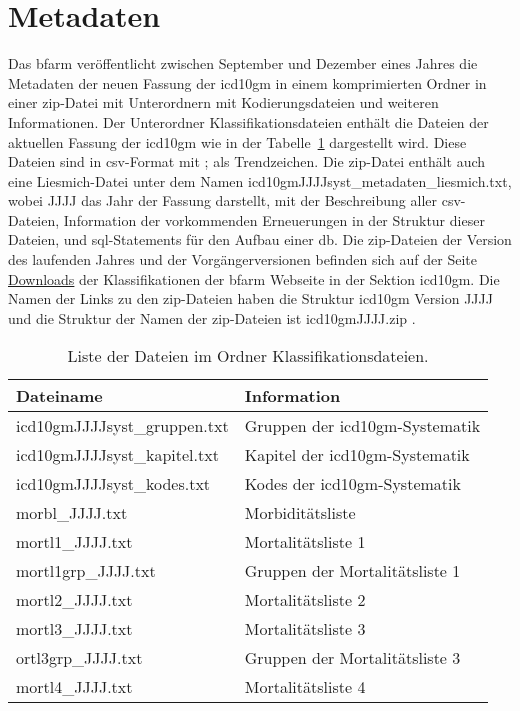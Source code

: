 \section{Metadaten} \label{sec:metadata}

Das \ac{bfarm} veröffentlicht zwischen September und Dezember eines Jahres die Metadaten der neuen Fassung der \ac{icd10gm} in einem komprimierten Ordner in einer \ac{zip}-Datei mit Unterordnern  mit Kodierungsdateien und weiteren Informationen. Der Unterordner Klassifikationsdateien enthält die Dateien der aktuellen Fassung der \ac{icd10gm} wie in der Tabelle~\ref{tab:classfiles} dargestellt wird. Diese Dateien sind in \ac{csv}-Format mit \glqq ;\grqq{} als Trendzeichen. Die \ac{zip}-Datei enthält auch eine Liesmich-Datei unter dem Namen \glqq\textsf{icd10gmJJJJsyst\_metadaten\_liesmich.txt}\grqq{}, wobei \glqq\textsf{JJJJ}\grqq{} das Jahr der Fassung darstellt, mit der Beschreibung aller \ac{csv}-Dateien, Information der vorkommenden Erneuerungen in der Struktur dieser Dateien, und \ac{sql}-Statements für den Aufbau einer \ac{db}. Die \ac{zip}-Dateien der Version des laufenden Jahres und der Vorgängerversionen befinden sich auf der Seite \href{https://www.dimdi.de/dynamic/de/klassifikationen/downloads/}{Downloads} der Klassifikationen der \ac{bfarm} Webseite in der Sektion \ac{icd10gm}. Die Namen der Links zu den \ac{zip}-Dateien haben die Struktur \glqq\textsf{\ac{icd10gm} Version JJJJ}\grqq{} und die Struktur der Namen der \ac{zip}-Dateien ist \glqq\textsf{\ac{icd10gm}JJJJ.zip}\grqq{} .


\begin{table}[ht]
	\centering
	\small
	\caption{Liste der Dateien im Ordner Klassifikationsdateien.}
	\label{tab:classfiles}
	\begin{tabular}{|l|l|}
		\hline
		\rowcolor{lightgray} Dateiname & Information \\
		\hline 
		\textsf{icd10gmJJJJsyst\_gruppen.txt} &  Gruppen der \ac{icd10gm}-Systematik \\ \hline
		\textsf{icd10gmJJJJsyst\_kapitel.txt} & Kapitel der \ac{icd10gm}-Systematik \\ \hline
		\textsf{icd10gmJJJJsyst\_kodes.txt} & Kodes der \ac{icd10gm}-Systematik \\ \hline
		\textsf{morbl\_JJJJ.txt} & Morbiditätsliste  \\ \hline
		\textsf{mortl1\_JJJJ.txt} & Mortalitätsliste 1 \\ \hline
		\textsf{mortl1grp\_JJJJ.txt} & Gruppen der Mortalitätsliste 1 \\ \hline
		\textsf{mortl2\_JJJJ.txt} & Mortalitätsliste 2 \\ \hline
		\textsf{mortl3\_JJJJ.txt} & Mortalitätsliste 3 \\ \hline
		\textsf{ortl3grp\_JJJJ.txt} & Gruppen der Mortalitätsliste 3 \\ \hline
		\textsf{mortl4\_JJJJ.txt} & Mortalitätsliste 4 \\ \hline
	\end{tabular}
\end{table}

